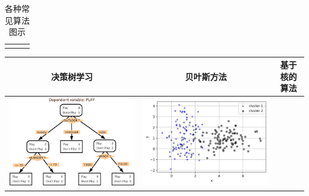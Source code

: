 \begin{longtable}[]{ccc}
\begin{minipage}{0.1\linewidth}
\end{minipage}
\tabularnewline
\bottomrule
\caption{各种常见算法图示}
\end{longtable}

\begin{longtable}[]{ccc}
    \label{fig:2.5.3}
  \toprule
  决策树学习 & 贝叶斯方法 & 基于核的算法
\tabularnewline
\midrule
\endhead
\begin{minipage}{0.1\linewidth}
  \includegraphics[width=1.0\linewidth]{./img/ch2/dec.png}  
\end{minipage}
&
\begin{minipage}{0.1\linewidth}
  \includegraphics[width=1.0\linewidth]{./img/ch2/sec1/5.jpg}  
\end{minipage}
&
\begin{minipage}{0.1\linewidth}

\end{minipage}
\end{longtable}
